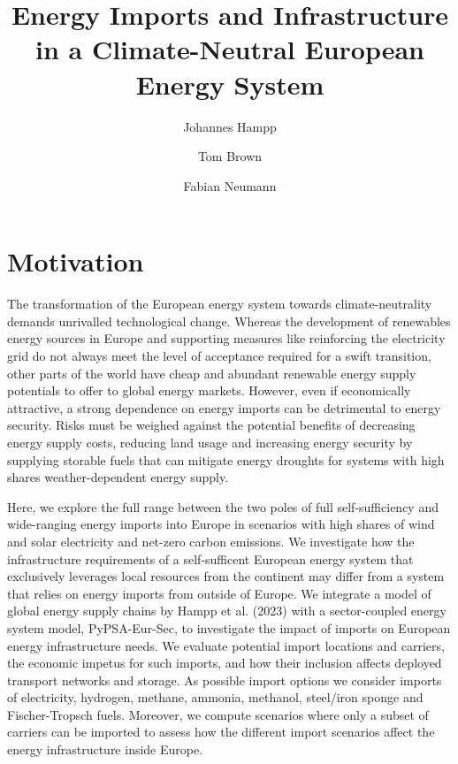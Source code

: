 \documentclass[10pt,5p,reversenotenum,lefttitle]{elsarticle}
\begin{document}
\begin{frontmatter}

	\title{Energy Imports and Infrastructure in a Climate-Neutral European Energy System}

	\author[jlu]{Johannes Hampp}
    \author[tub]{Tom Brown}
	\author[tub]{Fabian Neumann}
	\address[jlu]{Center for International Development and Environmental Research, Justus-Liebig-University Gießen, Gießen, Germany}
	\address[tub]{Department of Digital Transformation in Energy Systems, Institute of Energy Technology, Technische Universität Berlin, Fakultät III, Einsteinufer 25 (TA 8), 10587 Berlin, Germany}

\end{frontmatter}

\section*{Motivation}

The transformation of the European energy system towards climate-neutrality
demands unrivalled technological change. Whereas the development of renewables
energy sources in Europe and supporting measures like reinforcing the
electricity grid do not always meet the level of acceptance required for a swift
transition, other parts of the world have cheap and abundant renewable energy
supply potentials to offer to global energy markets. However, even if
economically attractive, a strong dependence on energy imports can be
detrimental to energy security. Risks must be weighed against the potential
benefits of decreasing energy supply costs, reducing land usage and increasing
energy security by supplying storable fuels that can mitigate energy droughts
for systems with high shares weather-dependent energy supply.

Here, we explore the full range between the two poles of full self-sufficiency
and wide-ranging energy imports into Europe in scenarios with high shares of
wind and solar electricity and net-zero carbon emissions. We investigate how the
infrastructure requirements of a self-sufficent European energy system that
exclusively leverages local resources from the continent may differ from a
system that relies on energy imports from outside of Europe. We integrate a
model of global energy supply chains by Hampp et al. (2023) with a
sector-coupled energy system model, PyPSA-Eur-Sec, to investigate the impact of
imports on European energy infrastructure needs. We evaluate potential import
locations and carriers, the economic impetus for such imports, and how their
inclusion affects deployed transport networks and storage. As possible import
options we consider imports of electricity, hydrogen, methane, ammonia,
methanol, steel/iron sponge and Fischer-Tropsch fuels. Moreover, we compute
scenarios where only a subset of carriers can be imported to assess how the
different import scenarios affect the energy infrastructure inside Europe.
\end{document}
